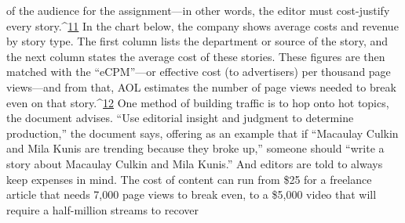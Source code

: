 of the audience for the assignment—in other words, the editor must cost-justify
every story.^{\href{#endnotes-ch9}{11}} In the chart below, the company shows average costs and revenue
by story type. The first column lists the department or source of the story, and
the next column states the average cost of these stories. These figures are then
matched with the ``eCPM''—or effective cost (to advertisers) per thousand page
views—and from that, AOL estimates the number of page views needed to break
even on that story.^{\href{#endnotes-ch9}{12}}
One method of building traffic is to hop onto hot topics, the document advises.
``Use editorial insight and judgment to determine production,'' the document
says, offering as an example that if ``Macaulay Culkin and Mila Kunis are trending
because they broke up,'' someone should ``write a story about Macaulay Culkin
and Mila Kunis.'' And editors are told to always keep expenses in mind. The cost
of content can run from \$25 for a freelance article that needs 7,000 page views
to break even, to a \$5,000 video that will require a half-million streams to recover

